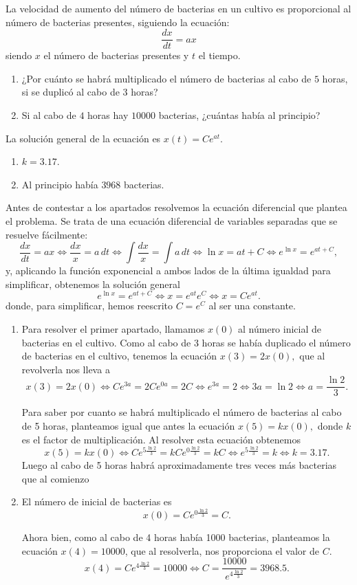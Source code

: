 {La velocidad de aumento del número de bacterias en un cultivo es proporcional al número de bacterias presentes, siguiendo la ecuación:
\[
\frac{dx}{dt}=ax
\]
siendo $x$ el número de bacterias presentes y $t$ el tiempo.
\begin{enumerate}
\item  ¿Por cuánto se habrá multiplicado el número de bacterias al cabo de $5$ horas, si se duplicó al cabo de $3$ horas?
\item  Si al cabo de $4$ horas hay $10000$ bacterias,  ¿cuántas había al principio?
\end{enumerate}
}
{La solución general de la ecuación es $x(t)=Ce^{at}$.
\begin{enumerate}
\item $k=3.17$.
\item Al principio había $3968$ bacterias.
\end{enumerate}
}
{Antes de contestar a los apartados resolvemos la ecuación diferencial que plantea el problema. Se trata de una ecuación diferencial de variables separadas que se resuelve fácilmente:
\[
\frac{dx}{dt}=ax \Longleftrightarrow \frac{dx}{x}=a\,dt \Longleftrightarrow
\int \frac{dx}{x} = \int a\,dt \Longleftrightarrow \ln x = at+C \Longleftrightarrow
e^{\ln x}=e^{at+C},
\]
y, aplicando la función exponencial a ambos lados de la última igualdad para simplificar, obtenemos la solución general
\[
e^{\ln x}=e^{at+C} \Longleftrightarrow x=e^{at}e^{C} \Longleftrightarrow x=Ce^{at}.
\]
donde, para simplificar, hemos reescrito $C=e^C$ al ser una constante.
\begin{enumerate}
\item Para resolver el primer apartado, llamamos $x(0)$ al número inicial de bacterias en el cultivo. Como al cabo de 3 horas se había duplicado el número de bacterias en el cultivo, tenemos la ecuación $x(3)=2x(0),$ que al revolverla nos lleva a
\[
x(3)=2x(0) \Longleftrightarrow Ce^{3a}=2Ce^{0a}=2C \Longleftrightarrow
e^{3a}=2 \Longleftrightarrow 3a=\ln 2 \Longleftrightarrow a=\frac{\ln 2}{3}.
\]

Para saber por cuanto se habrá multiplicado el número de bacterias al cabo de 5 horas, planteamos igual que antes la ecuación $x(5)=kx(0),$ donde $k$ es el factor de multiplicación. Al resolver esta ecuación obtenemos
\[
x(5)=kx(0)\Longleftrightarrow Ce^{5\frac{\ln 2}3}=kCe^{0\frac{\ln 2}{3}}=kC \Longleftrightarrow e^{5\frac{\ln 2}{3}}=k \Longleftrightarrow k=3.17.
\]
Luego al cabo de 5 horas habrá aproximadamente tres veces más bacterias que al comienzo

\item El número de inicial de bacterias es
\[
x(0)=Ce^{0\frac{\ln 2}3}=C.
\]

Ahora bien, como al cabo de 4 horas había 1000 bacterias, planteamos la ecuación $x(4)=10000$, que al resolverla, nos proporciona el valor de $%
C.$
\[
x(4)=Ce^{4\frac{\ln 2}{3}}=10000 \Longleftrightarrow C=\frac{10000}{e^{4\frac{\ln 2}3}} = 3968.5.
\]
\end{enumerate}
}


